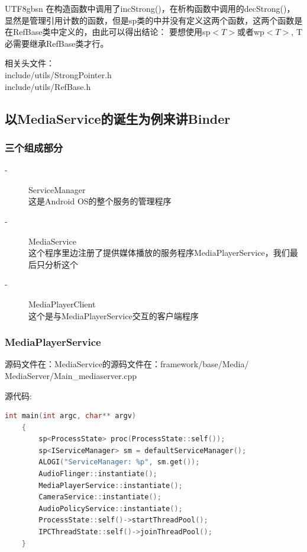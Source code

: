 \documentclass[a4paper,11pt]{article}
\begin{document}
\begin{CJK*}{UTF8}{gbsn}
    在构造函数中调用了incStrong()，在析构函数中调用的decStrong()，显然是管理引用计数的函数，但是sp类的中并没有定义这两个函数，这两个函数是在RefBase类中定义的，由此可以得出结论：
    {\color{red}要想使用sp$<T>$或者wp$<T>$, T必需要继承RefBase类才行}。

    相关头文件：\\
    include/utils/StrongPointer.h \\
    include/utils/RefBase.h

    \subsection{以MediaService的诞生为例来讲Binder}
    \subsubsection{三个组成部分}
    \begin{description}
        \item[-] ServiceManager \\ 这是Android OS的整个服务的管理程序
        \item[-] MediaService \\ 这个程序里边注册了提供媒体播放的服务程序MediaPlayerService，我们最后只分析这个
        \item[-] MediaPlayerClient \\ 这个是与MediaPlayerService交互的客户端程序
    \end{description}
    \subsubsection{MediaPlayerService}
    源码文件在：MediaService的源码文件在：framework/base/Media/\\MediaServer/Main\_mediaserver.cpp 

    源代码:\\
    \begin{lstlisting}[language=C++]
    int main(int argc, char** argv)
    {
        sp<ProcessState> proc(ProcessState::self());
        sp<IServiceManager> sm = defaultServiceManager();
        ALOGI("ServiceManager: %p", sm.get());
        AudioFlinger::instantiate();
        MediaPlayerService::instantiate();
        CameraService::instantiate();                                                                                                                                                             
        AudioPolicyService::instantiate();
        ProcessState::self()->startThreadPool();
        IPCThreadState::self()->joinThreadPool();
    }
    \end{lstlisting}





\end{CJK*}
\end{document}
